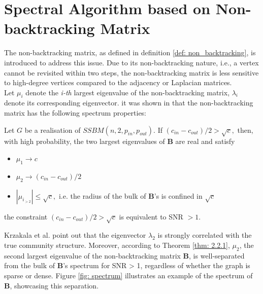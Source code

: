\section{Spectral Algorithm based on Non-backtracking Matrix}\label{sec: Spectral Algorithm based on Non-backtracking Matrix}
The non-backtracking matrix, as defined in definition \ref{def: non_backtracking}, is introduced to address this issue. Due to its non-backtracking nature, i.e., a vertex cannot be revisited within two steps, the non-backtracking matrix is less sensitive to high-degree vertices compared to the adjacency or Laplacian matrices.\\
Let $\mu_i$ denote the \textit{i-th} largest eigenvalue of the non-backtracking matrix, $\lambda_i$ denote its corresponding eigenvector.
it was shown in \cite{the_non-backtracking} that the non-backtracking matrix has the following spectrum properties:
\begin{theorem}\label{thm: 2.2.1}
    Let $G$ be a realisation of $SSBM(n, 2, p_{in}, p_{out}).$ If $(c_{in}-c_{out})/2>\sqrt{c},$ then, with high probability, the two largest eigenvalues of $\mathbf{B}$ are real and satisfy
    \begin{itemize}
     \vspace{-5mm}
        \item $\mu_1\to c$
        \vspace{-3mm}
        \item $\mu_2\to(c_{in}-c_{out})/2$
        \vspace{-3mm}
        \item $|\mu_{i_{>2}}|\leq\sqrt{c},$ i.e. the radius of the bulk of $\mathbf{B}$'s is confined in $\sqrt{c}$
    \end{itemize}
\end{theorem}
\begin{remark}
    the constraint $(c_{in}-c_{out})/2>\sqrt{c}$ is equivalent to SNR $>1.$
\end{remark}
Krzakala et al. \cite{the_non-backtracking} point out that the eigenvector $\lambda_2$ is strongly correlated with the true community structure. Moreover, according to Theorem \ref{thm: 2.2.1}, $\mu_2$, the second largest eigenvalue of the non-backtracking matrix $\mathbf{B}$, is well-separated from the bulk of $\mathbf{B}$'s spectrum for SNR > 1, regardless of whether the graph is sparse or dense. Figure \ref{fig: spectrum} illustrates an example of the spectrum of $\mathbf{B}$, showcasing this separation.
